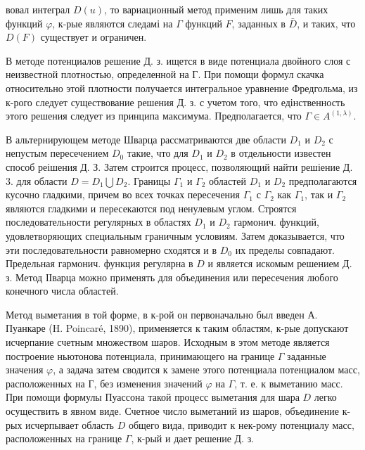 \documentclass[10pt]{article}
\begin{document}
вовал интеграл $D(u)$, то вариационный метод применим лишь для таких функций $\varphi$, к-рые являются следамі на $\Gamma$ функций $F$, заданных в $\bar{D}$, и таких, что $D(F)$ существует и ограничен.



В методе потенциалов решение Д. з. ищется в виде потенциала двойного слоя с неизвестной плотностью, определенной на $Г$. При помощи формул скачка относительно этой плотности получается интегральное уравнение Фредгольма, из к-рого следует существование решения Д. з. с учетом того, что едінственность этого решения следует из принципа максимума. Предполагается, что $\Gamma \in A^{(1, \lambda)}$.



В альтернирующем методе Шварца рассматриваются две области $D_{1}$ и $D_{2}$ с непустым пересечением $D_{0}$ такие, что для $D_{1}$ и $D_{2}$ в отдельности известен способ реішения Д. З. Затем строится процесс, позволяющий найти решіение Д. 3. для области $D=D_{1} \bigcup D_{2}$. Границы $\Gamma_{1}$ и $\Gamma_{2}$ областей $D_{1}$ и $D_{2}$ предполагаются кусочно гладкими, причем во всех точках пересечения $\Gamma_{1}$ с $\Gamma_{2}$ как $\Gamma_{1}$, так и $\Gamma_{2}$ являются гладкими и пересекаются под ненулевым углом. Строятся последовательности регулярных в областях $D_{1}$ и $D_{2}$ гармонич. функций, удовлетворяющих специальным граничным условиям. Затем доказывается, что эти последовательности равномерно сходятся и в $D_{0}$ их пределы совпадают. Предельная гармонич. функция регулярна в $D$ и является искомым решением Д. з. Метод ІІварца можно применять для объединения или пересечения любого конечного числа областей.



Метод выметания в той форме, в к-рой он первоначально был введен А. Пуанкаре (H. Poincaré, 1890), применяется к таким областям, к-рые допускают исчерпание счетным множеством шаров. Исходным в этом методе является построение ньютонова потенциала, принимающего на границе $\Gamma$ заданные значения $\varphi$, а задача затем сводится к замене этого потенциала потенциалом масс, расположенных на $Г$, без изменения значений $\varphi$ на $\Gamma$, т. е. к выметанию масс. При помощи формулы Пуассона такой процесс выметания для шара $D$ легко осуществить в явном виде. Счетное число выметаний из шаров, объединение к-рых исчерпывает область $D$ общего вида, приводит к нек-рому потенциалу масс, расположенных на границе $\Gamma$, к-рый и дает решение Д. $з$.
\end{document}
